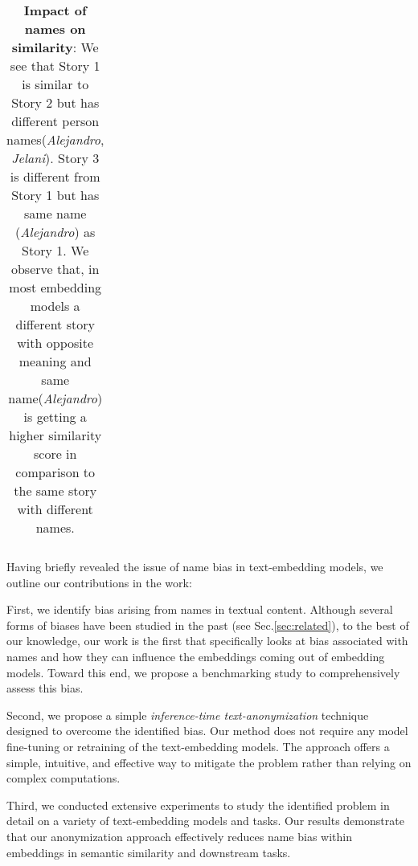 \begin{table}[ht!]
{\begin{tabular}{lcc}
\hline
\end{tabular}
}
\caption{\textbf{Impact of names on similarity}: %
We see that Story 1 is similar to Story 2 but has different person names(\textit{Alejandro}, \textit{Jelani}). Story 3 is different from Story 1 but has same name (\textit{Alejandro}) as Story 1. We observe that, in most embedding models a different story with opposite meaning and same name(\textit{Alejandro}) is getting a higher similarity score in comparison to the same story with different names. \label{tab:opening_example_story}}
\vskip -0.1in
\end{table}


Having briefly revealed the issue of name bias in text-embedding models, we  outline our contributions in the work:

    First, we identify bias arising from names in textual content. Although several forms of biases have been studied in the past (see Sec.\ref{sec:related}), to the best of our knowledge, our work is the first that specifically looks at bias associated with names and how they can influence the embeddings coming out of embedding models. Toward this end, we propose a benchmarking study to comprehensively assess this bias.
    
    Second, we propose a simple \textit{inference-time text-anonymization} technique designed to overcome the identified bias. Our method does not require any model fine-tuning or retraining of the text-embedding models. The approach offers a simple, intuitive, and effective way to mitigate the problem rather than relying on complex computations.

    Third, we conducted extensive experiments to study the identified problem in detail on a variety of text-embedding models and tasks. Our results demonstrate that our anonymization approach effectively reduces name bias within embeddings in semantic similarity and downstream tasks. 

    \vspace{-0.05in}
   






